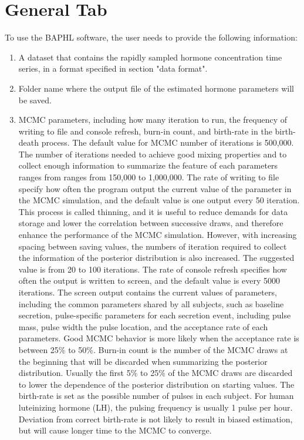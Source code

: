 \documentclass[11pt]{book}
\begin{document}
\section{General Tab}
To use the BAPHL software, the user needs to provide the following information:
\begin{enumerate}
\item A dataset that contains the rapidly sampled hormone concentration time series, in a format specified in section "data format".
\item Folder name where the output file of the estimated hormone parameters will be saved.
\item MCMC parameters, including how many iteration to run, the frequency of writing to file and console refresh, burn-in count, and birth-rate in the birth-death process. The default value for MCMC number of iterations is 500,000.  The number of iterations needed to achieve good mixing properties and to collect enough information to summarize the feature of each parameters ranges from ranges from 150,000 to 1,000,000. The rate of writing to file specify how often the program output the current value of the parameter in the MCMC simulation, and the default value is one output every 50 iteration. This process is called thinning, and it is useful to reduce demands for data storage and lower the correlation between successive draws, and therefore enhance the performance of the MCMC simulation. However, with increasing spacing between saving values, the numbers of iteration required to collect the information of the posterior distribution is also increased. The suggested value is from 20 to 100 iterations. The rate of console refresh specifies how often the output is written to screen, and the default value is every 5000 iterations. The screen output contains the current values of parameters, including the common parameters shared by all subjects, such as baseline secretion, pulse-specific parameters for each secretion event, including pulse mass, pulse width the pulse location, and the acceptance rate of each parameters. Good MCMC behavior is more likely when the acceptance rate is between 25\% to 50\%. Burn-in count is the number of the MCMC draws at the beginning that will be discarded when summarizing the posterior distribution. Usually the first 5\% to 25\% of the MCMC draws are discarded to lower the dependence of the posterior distribution on starting values. The birth-rate is set as the possible number of pulses in each subject. For human luteinizing hormone (LH), the pulsing frequency is usually 1 pulse per hour. Deviation from correct birth-rate is not likely to result in biased estimation, but will cause longer time to the MCMC to converge.
\end{enumerate}
\end{document}
